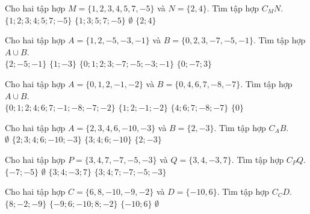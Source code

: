 \begin{ex}
 Cho hai tập hợp $M=\{{1, 2, 3, 4, 5, 7, -5}\}$ và $N=\{{2, 4}\}$. Tìm tập hợp $C_M N$.\\ 
\choice
{ $\{{1; 2; 3; 4; 5; 7; -5}\}$ }
   { \True $\{{1; 3; 5; 7; -5}\}$ }
     { $\emptyset$ }
    { $\{{2; 4}\}$ }
\end{ex}

\begin{ex}
 Cho hai tập hợp $A=\{{1, 2, -5, -3, -1}\}$ và $B=\{{0, 2, 3, -7, -5, -1}\}$. Tìm tập hợp $A\cup B$. \\ 
\choice
{ $\{{2; -5; -1}\}$ }
   { $\{{1; -3}\}$ }
     { \True $\{{0; 1; 2; 3; -7; -5; -3; -1}\}$ }
    { $\{{0; -7; 3}\}$ }
\loigiai{ 
  
 }\end{ex}

\begin{ex}
 Cho hai tập hợp $A=\{{0, 1, 2, -1, -2}\}$ và $B=\{{0, 4, 6, 7, -8, -7}\}$. Tìm tập hợp $A\cup B$. \\ 
\choice
{ \True $\{{0; 1; 2; 4; 6; 7; -1; -8; -7; -2}\}$ }
   { $\{{1; 2; -1; -2}\}$ }
     { $\{{4; 6; 7; -8; -7}\}$ }
    { $\{{0}\}$ }
\loigiai{ 
  
 }\end{ex}

\begin{ex}
 Cho hai tập hợp $A=\{{2, 3, 4, 6, -10, -3}\}$ và $B=\{{2, -3}\}$. Tìm tập hợp $C_A B$.\\ 
\choice
{ $\emptyset$ }
   { $\{{2; 3; 4; 6; -10; -3}\}$ }
     { \True $\{{3; 4; 6; -10}\}$ }
    { $\{{2; -3}\}$ }
\end{ex}

\begin{ex}
 Cho hai tập hợp $P=\{{3, 4, 7, -7, -5, -3}\}$ và $Q=\{{3, 4, -3, 7}\}$. Tìm tập hợp $C_P Q$.\\ 
\choice
{ \True $\{{-7; -5}\}$ }
   { $\emptyset$ }
     { $\{{3; 4; -3; 7}\}$ }
    { $\{{3; 4; 7; -7; -5; -3}\}$ }
\end{ex}

\begin{ex}
 Cho hai tập hợp $C=\{{6, 8, -10, -9, -2}\}$ và $D=\{{-10, 6}\}$. Tìm tập hợp $C_C D$.\\ 
\choice
{ \True $\{{8; -2; -9}\}$ }
   { $\{{-9; 6; -10; 8; -2}\}$ }
     { $\{{-10; 6}\}$ }
    { $\emptyset$ }
\end{ex}


